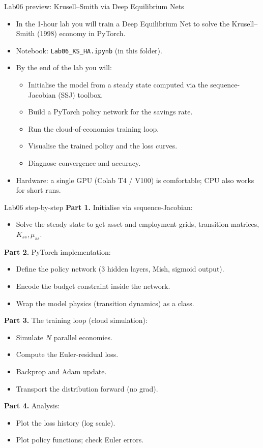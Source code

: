 \documentclass[10pt,english,aspectratio=169]{beamer}
\begin{document}
\begin{frame}{Lab06 preview: Krusell--Smith via Deep Equilibrium Nets}
\begin{itemize}
\item In the 1-hour lab you will train a Deep Equilibrium Net to solve the Krusell--Smith (1998) economy in PyTorch.
\medskip
\item Notebook: \texttt{Lab06\_KS\_HA.ipynb} (in this folder).
\medskip
\item By the end of the lab you will:
  \begin{itemize}
  \item Initialise the model from a steady state computed via the sequence-Jacobian (SSJ) toolbox.
  \item Build a PyTorch policy network for the savings rate.
  \item Run the cloud-of-economies training loop.
  \item Visualise the trained policy and the loss curves.
  \item Diagnose convergence and accuracy.
  \end{itemize}
\medskip
\item Hardware: a single GPU (Colab T4 / V100) is comfortable; CPU also works for short runs.
\end{itemize}
\end{frame}

\begin{frame}{Lab06 step-by-step}
\textbf{Part 1.} Initialise via sequence-Jacobian:
\begin{itemize}
\item Solve the steady state to get asset and employment grids, transition matrices, $K_{ss}, \mu_{ss}$.
\end{itemize}
\medskip

\textbf{Part 2.} PyTorch implementation:
\begin{itemize}
\item Define the policy network (3 hidden layers, Mish, sigmoid output).
\item Encode the budget constraint inside the network.
\item Wrap the model physics (transition dynamics) as a class.
\end{itemize}
\medskip

\textbf{Part 3.} The training loop (cloud simulation):
\begin{itemize}
\item Simulate $N$ parallel economies.
\item Compute the Euler-residual loss.
\item Backprop and Adam update.
\item Transport the distribution forward (no grad).
\end{itemize}
\medskip

\textbf{Part 4.} Analysis:
\begin{itemize}
\item Plot the loss history (log scale).
\item Plot policy functions; check Euler errors.
\end{itemize}
\end{frame}
\end{document}
